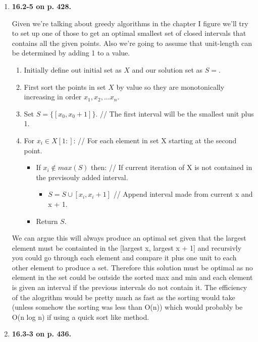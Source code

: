 \documentclass{article}
\begin{document}
\begin{enumerate}
    \item \textbf{16.2-5 on p. 428.}
    
    Given we're talking about greedy algorithms in the chapter I figure we'll try to set up one of those to get an optimal smallest set of closed intervals that contains all the given points.
    Also we're going to assume that unit-length can be determined by adding 1 to a value.

    \begin{enumerate}
      \item Initially define out initial set as $X$ and our solution set as $S = {}$.
      \item First sort the points in set $X$ by value so they are monotonically increasing in order $x_1, x_2,...x_n$.
      \item Set $S = \{[x_0, x_0 + 1]\}$. // The first interval will be the smallest unit plus 1.
      \item For $x_i \in X[1:]$: // For each element in set X starting at the second point.
      \begin{itemize}
        \item If $x_i \notin max(S)$ then: // If current iteration of X is not contained in the previsouly added interval.
        \begin{itemize}          
          \item $S = S \cup [x_i, x_i + 1]$ // Append interval made from current x and x + 1.        
        \end{itemize}
        \item Return $S$.
      \end{itemize}
    \end{enumerate}

    We can argue this will always produce an optimal set given that the largest element must be containted in the [largest x, largest x + 1] and recursivly you could go through each element and compare it plus one unit to each other element to produce a set.
    Therefore this solution must be optimal as no element in the set could be outside the sorted max and min and each element is given an interval if the previous intervals do not contain it.
    The efficiency of the alogrithm would be pretty much as fast as the sorting would take (unless somehow the sorting was less than O(n)) which would probably be O(n log n) if using a quick sort like method.

    \item \textbf{16.3-3 on p. 436.}
    

\end{enumerate}
\end{document}
